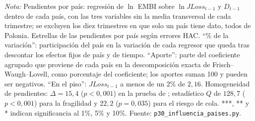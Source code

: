 \begin{table}[htbp]
\par\smallskip\parbox{0.95\linewidth}{\footnotesize \textit{Nota:} Pendientes por país: regresión de $\ln$ EMBI sobre $\ln JLoss_{t-1}$ y $D_{t-1}$ dentro de cada país, con las tres variables sin la media transversal de cada trimestre; se excluyen los diez trimestres en que solo un país tiene dato, todos de Polonia. Estrellas de las pendientes por país según errores HAC. ``\% de la variación'': participación del país en la variación de cada regresor que queda tras descontar los efectos fijos de país y de tiempo. ``Aporte'': parte del coeficiente agrupado que proviene de cada país en la descomposición exacta de Frisch--Waugh--Lovell, como porcentaje del coeficiente; los aportes suman 100 y pueden ser negativos. ``En el piso'': $JLoss_{t-1}$ a menos de un 2\% de $2{,}16$. Homogeneidad de pendientes: $\Delta=15{,}4$ ($p<0{,}001$) en la prueba de \citet{PesaranYamagata2008}; estadístico $Q$ de $128{,}7$ ($p<0{,}001$) para la fragilidad y $22{,}2$ ($p=0{,}035$) para el riesgo de cola. ***, ** y * indican significancia al 1\%, 5\% y 10\%. Fuente: \texttt{p30\_influencia\_paises.py}.}
\end{table}

